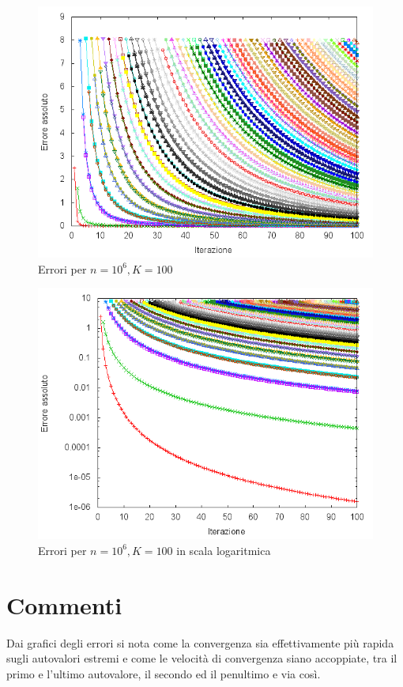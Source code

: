 \documentclass[11pt]{article}
\numberwithin{equation}{subsection}
\begin{document}
\begin{figure}[htb]
\centering
\includegraphics[scale=0.65]{./img/errors_n10^6K100.png}
\caption{\label{errori_ngrande}Errori per $n=10^6, K=100$}
\end{figure}

\begin{figure}[htb]
\centering
\includegraphics[scale=0.65]{./img/errors_n10^6K100_log.png}
\caption{Errori per $n=10^6, K=100$ in scala logaritmica}
\end{figure}


\section{Commenti}
\label{sec-4}
Dai grafici degli errori si nota come la convergenza sia effettivamente più rapida sugli autovalori estremi e come le velocità di convergenza siano accoppiate, tra il primo e l'ultimo autovalore, il secondo ed il penultimo e via così.
\end{document}
